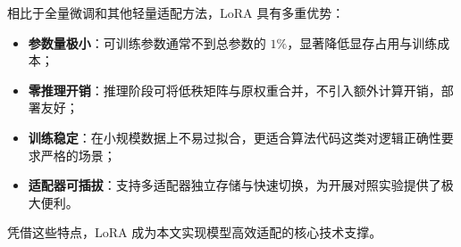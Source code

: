 相比于全量微调和其他轻量适配方法，LoRA 具有多重优势：
\begin{itemize}
    \item \textbf{参数量极小}：可训练参数通常不到总参数的 $1\%$，显著降低显存占用与训练成本；
    \item \textbf{零推理开销}：推理阶段可将低秩矩阵与原权重合并，不引入额外计算开销，部署友好；
    \item \textbf{训练稳定}：在小规模数据上不易过拟合，更适合算法代码这类对逻辑正确性要求严格的场景；
    \item \textbf{适配器可插拔}：支持多适配器独立存储与快速切换，为开展对照实验提供了极大便利。
\end{itemize}
凭借这些特点，LoRA 成为本文实现模型高效适配的核心技术支撑。
